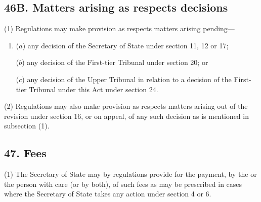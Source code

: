 \documentclass[a4paper]{article}
\begin{document}
\subsection{46B. Matters arising as respects decisions}

(1) Regulations may make provision as respects matters arising pending---
\begin{enumerate}\item[]
($a$) any decision of the Secretary of State under section 11, 12 or 17;

($b$) any decision of the First-tier Tribunal under section 20; or

($c$) any decision of the Upper Tribunal in relation to a decision of the First-tier
Tribunal under this Act under section 24.
\end{enumerate}

(2) Regulations may also make provision as respects matters arising out of the
revision under section 16, or on appeal, of any such decision as is mentioned in
subsection (1).



\subsection{47. Fees}

(1) The Secretary of State may by regulations provide for the payment, by
the  or the person with care (or by both), of such
fees as may be prescribed in cases where the Secretary of State takes%
 any action under section 4 or 6.
\end{document}
